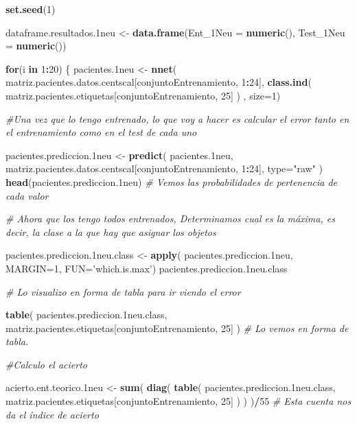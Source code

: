 \documentclass[]{article}
\newenvironment{Shaded}{\begin{snugshade}}{\end{snugshade}}
\newcommand{\KeywordTok}[1]{\textcolor[rgb]{0.13,0.29,0.53}{\textbf{#1}}}
\newcommand{\DataTypeTok}[1]{\textcolor[rgb]{0.13,0.29,0.53}{#1}}
\newcommand{\DecValTok}[1]{\textcolor[rgb]{0.00,0.00,0.81}{#1}}
\newcommand{\StringTok}[1]{\textcolor[rgb]{0.31,0.60,0.02}{#1}}
\newcommand{\CommentTok}[1]{\textcolor[rgb]{0.56,0.35,0.01}{\textit{#1}}}
\newcommand{\ControlFlowTok}[1]{\textcolor[rgb]{0.13,0.29,0.53}{\textbf{#1}}}
\newcommand{\OperatorTok}[1]{\textcolor[rgb]{0.81,0.36,0.00}{\textbf{#1}}}
\newcommand{\NormalTok}[1]{#1}
\begin{document}
\begin{Shaded}
\begin{Highlighting}[]
\KeywordTok{set.seed}\NormalTok{(}\DecValTok{1}\NormalTok{)}

\NormalTok{dataframe.resultados.1neu <-}\StringTok{ }\KeywordTok{data.frame}\NormalTok{(}\DataTypeTok{Ent_1Neu =} \KeywordTok{numeric}\NormalTok{(),}
                                        \DataTypeTok{Test_1Neu =} \KeywordTok{numeric}\NormalTok{())}

\ControlFlowTok{for}\NormalTok{(i }\ControlFlowTok{in} \DecValTok{1}\OperatorTok{:}\DecValTok{20}\NormalTok{)}
\NormalTok{\{}
\NormalTok{  pacientes.1neu <-}\StringTok{ }\KeywordTok{nnet}\NormalTok{( matriz.pacientes.datos.centscal[conjuntoEntrenamiento, }\DecValTok{1}\OperatorTok{:}\DecValTok{24}\NormalTok{], }\KeywordTok{class.ind}\NormalTok{( matriz.pacientes.etiquetas[conjuntoEntrenamiento, }\DecValTok{25}\NormalTok{] ) , }\DataTypeTok{size=}\DecValTok{1}\NormalTok{)}

  \CommentTok{#Una vez que lo tengo entrenado, lo que voy a hacer es calcular el error tanto en el entrenamiento como en el test de cada uno}
  
\NormalTok{  pacientes.prediccion.1neu <-}\StringTok{ }\KeywordTok{predict}\NormalTok{( pacientes.1neu, matriz.pacientes.datos.centscal[conjuntoEntrenamiento, }\DecValTok{1}\OperatorTok{:}\DecValTok{24}\NormalTok{], }\DataTypeTok{type=}\StringTok{"raw"}\NormalTok{ )}
  \KeywordTok{head}\NormalTok{(pacientes.prediccion.1neu) }\CommentTok{# Vemos las probabilidades de pertenencia de cada valor}
  
  \CommentTok{# Ahora que los tengo todos entrenados, Determinamos cual es la máxima, es decir, la clase a la que hay que asignar los objetos}
  
\NormalTok{  pacientes.prediccion.1neu.class <-}\StringTok{ }\KeywordTok{apply}\NormalTok{( pacientes.prediccion.1neu, }\DataTypeTok{MARGIN=}\DecValTok{1}\NormalTok{, }\DataTypeTok{FUN=}\StringTok{'which.is.max'}\NormalTok{)}
\NormalTok{  pacientes.prediccion.1neu.class}
  
  \CommentTok{# Lo visualizo en forma de tabla para ir viendo el error}
  
  \KeywordTok{table}\NormalTok{( pacientes.prediccion.1neu.class, matriz.pacientes.etiquetas[conjuntoEntrenamiento, }\DecValTok{25}\NormalTok{] )  }\CommentTok{# Lo vemos en forma de tabla.}
  
  \CommentTok{#Calculo el acierto}
  
\NormalTok{  acierto.ent.teorico.1neu <-}\StringTok{ }\KeywordTok{sum}\NormalTok{( }\KeywordTok{diag}\NormalTok{( }\KeywordTok{table}\NormalTok{( pacientes.prediccion.1neu.class, matriz.pacientes.etiquetas[conjuntoEntrenamiento, }\DecValTok{25}\NormalTok{] ) ) )}\OperatorTok{/}\DecValTok{55} \CommentTok{# Esta cuenta nos da el índice de acierto}
  

\end{Highlighting}
\end{Shaded}
\end{document}
